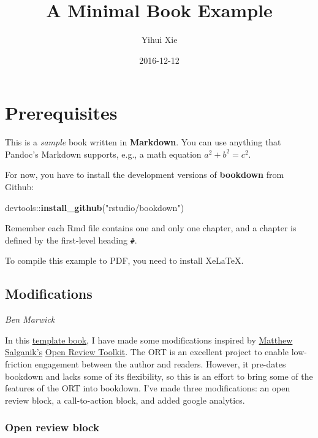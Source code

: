 \documentclass[]{book}
\title{A Minimal Book Example}
\author{Yihui Xie}
\date{2016-12-12}
\newenvironment{Shaded}{\begin{snugshade}}{\end{snugshade}}
\newcommand{\KeywordTok}[1]{\textcolor[rgb]{0.13,0.29,0.53}{\textbf{{#1}}}}
\newcommand{\StringTok}[1]{\textcolor[rgb]{0.31,0.60,0.02}{{#1}}}
\newcommand{\NormalTok}[1]{{#1}}
\begin{document}
\maketitle

{
\setcounter{tocdepth}{1}
\tableofcontents
}
\chapter{Prerequisites}\label{prerequisites}

This is a \emph{sample} book written in \textbf{Markdown}. You can use
anything that Pandoc's Markdown supports, e.g., a math equation
\(a^2 + b^2 = c^2\).

For now, you have to install the development versions of
\textbf{bookdown} from Github:

\begin{Shaded}
\begin{Highlighting}[]
\NormalTok{devtools::}\KeywordTok{install_github}\NormalTok{(}\StringTok{"rstudio/bookdown"}\NormalTok{)}
\end{Highlighting}
\end{Shaded}

Remember each Rmd file contains one and only one chapter, and a chapter
is defined by the first-level heading \texttt{\#}.

To compile this example to PDF, you need to install XeLaTeX.

\section{Modifications}\label{modifications}

\emph{Ben Marwick}

In this \href{https://github.com/benmarwick/bookdown-ort}{template
book}, I have made some modifications inspired by
\href{https://twitter.com/msalganik}{Matthew Salganik's}
\href{http://www.openreviewtoolkit.org/}{Open Review Toolkit}. The ORT
is an excellent project to enable low-friction engagement between the
author and readers. However, it pre-dates bookdown and lacks some of its
flexibility, so this is an effort to bring some of the features of the
ORT into bookdown. I've made three modifications: an open review block,
a call-to-action block, and added google analytics.

\subsection{Open review block}\label{open-review-block}
\end{document}
